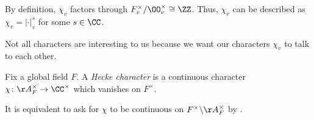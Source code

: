 \documentclass[../notes.tex]{subfiles}
\begin{document}
\begin{example}
	By definition, $\chi_v$ factors through $F_v^\times/\OO_v^\times\cong\ZZ$. Thus, $\chi_v$ can be described as $\chi_v=\left|\cdot\right|_v^s$ for some $s\in\CC$.
\end{example}
Not all characters are interesting to us because we want our characters $\chi_v$ to talk to each other.
\begin{definition}
	Fix a global field $F$. A \textit{Hecke character} is a continuous character $\chi\colon\AA_F^\times\to\CC^\times$ which vanishes on $F^\times$.
\end{definition}
\begin{remark}
	It is equivalent to ask for $\chi$ to be continuous on $F^\times\backslash\AA_F^\times$ by .
\end{remark}
\end{document}
